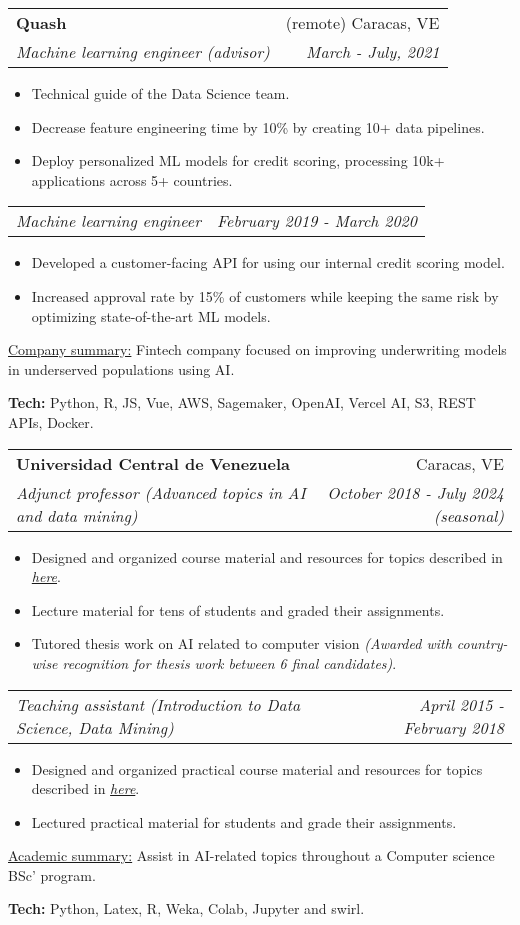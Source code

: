 \documentclass[letterpaper,11pt]{article}
\makeatletter
\newcommand{\sepsection}{\vspace{25pt}}
\newcommand{\resumeItem}[1]{%
  \item\small{
    #1
  }
}
\newcommand{\resumeSubheading}[4]{
  \vspace{8pt}\item%
    \begin{tabular*}{0.97\textwidth}[t]{l@{\extracolsep{\fill}}r}
      \textbf{#1} & #2 \\
      \textit{\small#3} & \textit{\small #4} \\
    \end{tabular*}\vspace{-5pt}
}
\newcommand{\resumeSubSubheading}[2]{
    \vspace{1pt}
    \begin{tabular*}{0.97\textwidth}{l@{\extracolsep{\fill}}r}
      \textit{\small#1} & \textit{\small #2} \\
    \end{tabular*}\vspace{-5pt}
}
\newcommand{\resumeItemListStart}{\begin{itemize}}
\newcommand{\resumeItemListEnd}{\end{itemize}\vspace{-5pt}}
\newcommand{\resumeTech}[2]{
 \underline{#1:} #2
}
\makeatother
\begin{document}
    \sepsection

    \resumeSubheading
      {Quash}{(remote) Caracas, VE}
      {Machine learning engineer (advisor)}{March - July, 2021}
      \resumeItemListStart
      \resumeItem{Technical guide of the Data Science team.}
      \resumeItem{Decrease feature engineering time by 10\% by creating 10+ data pipelines.}
      \resumeItem{Deploy personalized ML models for credit scoring, processing 10k+ applications across 5+ countries.}
      \resumeItemListEnd
      \resumeSubSubheading
      {Machine learning engineer}{February 2019 - March 2020}
     \resumeItemListStart
      \resumeItem{Developed a customer-facing API for using our internal credit scoring model.}
      \resumeItem{Increased approval rate by 15\% of customers while keeping the same risk by optimizing state-of-the-art ML models.}
      \resumeItemListEnd
      \resumeTech{Company summary}{Fintech company focused on improving underwriting models in underserved populations using AI.}
      \begin{tcolorbox}[width=.85\linewidth]
          \textbf{Tech:} Python, R, JS, Vue, AWS, Sagemaker, OpenAI, Vercel AI, S3, REST APIs, Docker.
      \end{tcolorbox}
      
    \sepsection

    \resumeSubheading
      {Universidad Central de Venezuela}{Caracas, VE}
      {Adjunct professor (Advanced topics in AI and data mining)}{October 2018 - July 2024 (seasonal)}
      \resumeItemListStart
      \resumeItem{Designed and organized course material and resources for topics described in \href{https://github.com/ucvia}{\textsl{here}}.}
      \resumeItem{Lecture material for tens of students and graded their assignments.}
      \resumeItem{Tutored thesis work on AI related to computer vision \newline \textsl{(Awarded with country-wise recognition for thesis work between 6 final candidates)}.}
      \resumeItemListEnd
    \resumeSubSubheading
      {Teaching assistant (Introduction to Data Science, Data Mining)}{April 2015 - February 2018}
     \resumeItemListStart
      \resumeItem{Designed and organized practical course material and resources for topics described in \href{https://github.com/ucvia}{\textsl{here}}.}
      \resumeItem{Lectured practical material for students and grade their assignments.}
      \resumeItemListEnd
      \resumeTech{Academic summary}{Assist in AI-related topics throughout a Computer science BSc' program.}
      \begin{tcolorbox}[width=.55\linewidth]
       \textbf{Tech:} Python, Latex, R, Weka, Colab, Jupyter and swirl.
      \end{tcolorbox}
\sepsection
\end{document}
